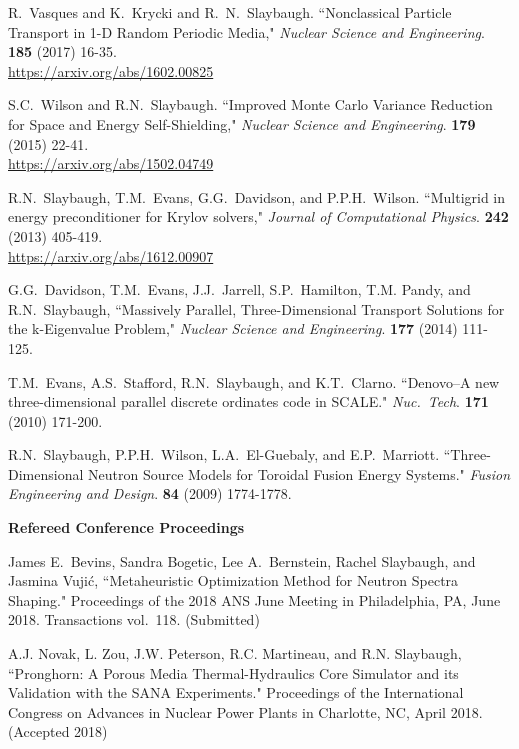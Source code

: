 \begin{bibsection}
\item R.\ Vasques and K.\ Krycki and R.\ N.\ Slaybaugh. ``Nonclassical Particle Transport in 1-D Random Periodic Media," \textit{Nuclear Science and Engineering}.  \textbf{185} (2017) 16-35.\\
\url{https://arxiv.org/abs/1602.00825}

\item S.C.\ Wilson and R.N.\ Slaybaugh. ``Improved Monte Carlo Variance Reduction for Space and Energy Self-Shielding," \textit{Nuclear Science and Engineering}. \textbf{179} (2015) 22-41.\\
\url{https://arxiv.org/abs/1502.04749}

\item R.N.\ Slaybaugh, T.M.\ Evans, G.G.\ Davidson, and P.P.H.\ Wilson. ``Multigrid in energy preconditioner for Krylov solvers," \textit{Journal of Computational Physics}. \textbf{242} (2013) 405-419.\\
\url{https://arxiv.org/abs/1612.00907}

\item G.G.\ Davidson, T.M.\ Evans, J.J.\ Jarrell, S.P.\ Hamilton, T.M. Pandy, and R.N.\ Slaybaugh, ``Massively Parallel, Three-Dimensional Transport Solutions for the k-Eigenvalue Problem," \textit{Nuclear Science and Engineering}. \textbf{177} (2014) 111-125.

\item T.M.\ Evans, A.S.\ Stafford, R.N.\ Slaybaugh, and K.T.\ Clarno. ``Denovo--A new three-dimensional parallel discrete ordinates code in SCALE." \textit{Nuc.\ Tech}. \textbf{171} (2010) 171-200.

\item R.N.\ Slaybaugh, P.P.H.\ Wilson, L.A.\ El-Guebaly, and E.P.\ Marriott. ``Three-Dimensional Neutron Source Models for Toroidal Fusion Energy Systems." \textit{Fusion Engineering and Design}. \textbf{84} (2009) 1774-1778. 

\item \textbf{Refereed Conference Proceedings}
\item James E.\ Bevins, Sandra Bogetic, Lee A.\ Bernstein, Rachel Slaybaugh, and Jasmina Vuji\'c, ``Metaheuristic Optimization Method for Neutron Spectra Shaping." Proceedings of the 2018 ANS June Meeting in Philadelphia, PA, June 2018. Transactions vol.\ 118. (Submitted)

\item A.J. Novak, L. Zou, J.W. Peterson, R.C. Martineau, and R.N. Slaybaugh,
``Pronghorn: A Porous Media Thermal-Hydraulics Core Simulator and its Validation with the SANA Experiments." Proceedings of the International Congress on Advances in Nuclear Power Plants in Charlotte, NC, April 2018. (Accepted 2018)


\end{bibsection}
